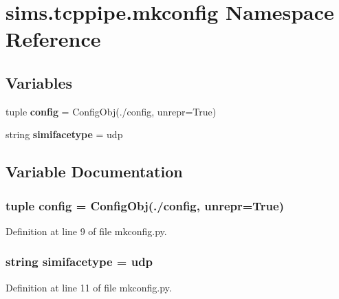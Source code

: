 \section{sims.\+tcppipe.\+mkconfig Namespace Reference}
\label{namespacesims_1_1tcppipe_1_1mkconfig}
\subsection*{Variables}
\begin{DoxyCompactItemize}
\item 
tuple {\bf config} = Config\+Obj(\textquotesingle{}./config\textquotesingle{}, unrepr=True)
\item 
string {\bf simifacetype} = \textquotesingle{}udp\textquotesingle{}
\end{DoxyCompactItemize}


\subsection{Variable Documentation}
\subsubsection[{config}]{\setlength{\rightskip}{0pt plus 5cm}tuple config = Config\+Obj(\textquotesingle{}./config\textquotesingle{}, unrepr=True)}\label{namespacesims_1_1tcppipe_1_1mkconfig_ad5f91786d7c873886a576621a2c1b0b5}


Definition at line 9 of file mkconfig.\+py.

\subsubsection[{simifacetype}]{\setlength{\rightskip}{0pt plus 5cm}string simifacetype = \textquotesingle{}udp\textquotesingle{}}\label{namespacesims_1_1tcppipe_1_1mkconfig_a7f5f5e89422cd15dfc1af6d7593d69c7}


Definition at line 11 of file mkconfig.\+py.

